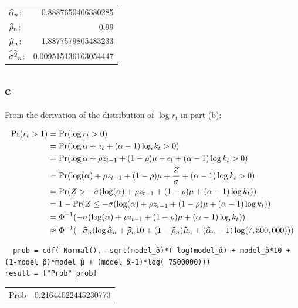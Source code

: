 \documentclass[12pt, letterpaper]{paper}
\begin{document}
\begin{center}
\begin{tabular}{lr}
\(\widehat{ \alpha }_{n}\): & 0.8887650406380285\\
\(\widehat{ \rho }_{n}\): & 0.99\\
\(\widehat{ \mu }_{n}\): & 1.8877579805483233\\
\(\widehat{ \sigma^{2} }_{n}\): & 0.009515136163054447\\
\end{tabular}
\end{center}

\subsection{c}
\label{sec:org4cb7b57}
From the derivation of the distribution of $\log r_t$ in part (b):

\begin{align*}
    \Pr( r_t > 1) &= \Pr( \log r_t > 0)\\
                  &= \Pr( \log \alpha + z_t + (\alpha - 1)\log k_t > 0)\\
                  &= \Pr( \log \alpha + \rho z_{t-1} + (1 - \rho)\mu + \epsilon_t + (\alpha-1) \log k_t > 0)\\
    &= \Pr( \log(\alpha) + \rho z_{t-1} + (1-\rho)\mu + \frac{Z}{\sigma} + (\alpha-1) \log k_t
      > 0)\\
                  &= \Pr( Z > - \sigma ( \log(\alpha) + \rho z_{t-1} + (1-\rho)\mu + (\alpha-1)\log k_t))\\
    &= 1 - \Pr( Z \leq - \sigma ( \log(\alpha) + \rho z_{t-1} + (1-\rho)\mu + (\alpha-1)\log
      k_t))\\
                  &= { \Phi}^{-1}( - \sigma ( \log(\alpha) + \rho z_{t-1} + (1-\rho)\mu + (\alpha-1)\log k_t ))\\
    &\approx {\Phi}^{-1}( -\widehat{ \sigma }_{n} ( \log \widehat{ \alpha }_{n} + \widehat{ \rho }_{n}10 + (1-\widehat{ \rho }_{n})
      \widehat{ \mu }_{n} + (\widehat{ \alpha }_{n} - 1) \log( 7,500,000) ))\\
  \end{align*}

\begin{verbatim}
  prob = cdf( Normal(), -sqrt(model_̂σ)*( log(model_̂α) + model_̂ρ*10 + (1-model_̂ρ)*model_̂μ + (model_̂α-1)*log( 7500000)))
result = ["Prob" prob]
\end{verbatim}

\begin{center}
\begin{tabular}{lr}
Prob & 0.21644022445230773\\
\end{tabular}
\end{center}
\end{document}
